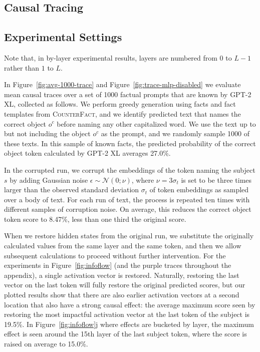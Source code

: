 \documentclass{article}
\newcommand{\cfd}{\textsc{CounterFact}\xspace}
\newcommand{\reffig}[1]{Figure~\ref{fig:#1}}
\begin{document}
\begin{appendices}
\section{Causal Tracing}
\label{apd:causal-tracing}

\subsection{Experimental Settings}
\label{apd:causal-tracing-details}

Note that, in by-layer experimental results, layers  are numbered from 0 to $L-1$ rather than $1$ to $L$.

In \reffig{avg-1000-trace} and \reffig{trace-mlp-disabled} we evaluate mean causal traces over a set of 1000 factual prompts that are known by GPT-2 XL, collected as follows.  We perform greedy generation using facts and fact templates from \cfd, and we identify predicted text that names the correct object $o^c$ before naming any other capitalized word.  We use the text up to but not including the object $o^c$ as the prompt, and we randomly sample 1000 of these texts.  In this sample of known facts, the predicted probability of the correct object token calculated by GPT-2 XL averages 27.0\%.

In the corrupted run, we corrupt the embeddings of the token naming the subject $s$ by adding Gaussian noise $\epsilon \sim \mathcal{N}(0; \nu)$, where $\nu = 3\sigma_t$ is set to be three times larger than the observed standard deviation $\sigma_t$ of token embeddings as sampled over a body of text.
For each run of text, the process is repeated ten times with different samples of corruption noise.  On average, this reduces the correct object token score to 8.47\%, less than one third the original score.

When we restore hidden states from the original run, we substitute the originally calculated values from the same layer and the same token, and then we allow subsequent calculations to proceed without further intervention.  For the experiments in \reffig{infoflow} (and the purple traces throughout the appendix), a single activation vector is restored.  Naturally, restoring the last vector on the last token will fully restore the original predicted scores, but our plotted results show that there are also earlier activation vectors at a second location that also have a strong causal effect: the average maximum score seen by restoring the most impactful activation vector at the last token of the subject is 19.5\%.  In \reffig{infoflow}j where effects are bucketed by layer, the maximum effect is seen around the 15th layer of the last subject token, where the score is raised on average to 15.0\%.



\end{appendices}
\end{document}
